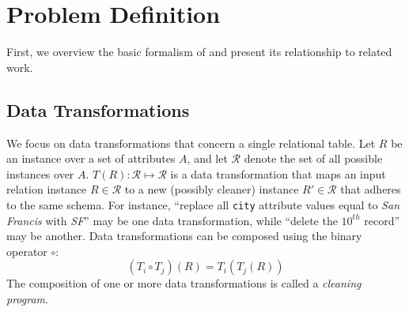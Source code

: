 \section{Problem Definition}
First, we overview the basic formalism of \sys and present its relationship to related work.

\subsection{Data Transformations}
We focus on data transformations that concern a single relational table. 
Let $R$ be an instance over a set of attributes $A$, and let $\mathcal{R}$ denote the set of all possible instances over $A$.
$T(R): \mathcal{R} \mapsto \mathcal{R}$ is a data transformation that maps an input relation instance $R \in \mathcal{R}$ to a new (possibly cleaner) instance $R' \in \mathcal{R}$ that adheres to the same schema.  For instance, ``replace all \texttt{city} attribute values equal to {\it San Francis} with {\it SF}'' may be one data transformation, while ``delete the $10^{th}$ record'' may be another.   Data transformations can be composed using the binary operator $\circ$:
\[
(T_i \circ T_j)(R) =  T_i(T_j(R))
\]
The composition of one or more data transformations is called a {\it cleaning program}.   

